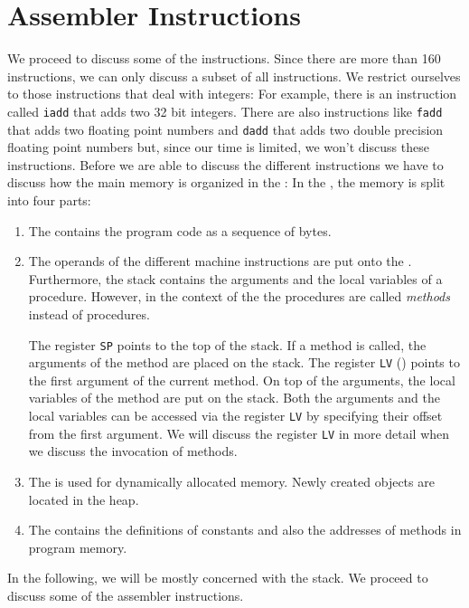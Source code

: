 \section{Assembler Instructions}
We proceed to discuss some of the  instructions.  Since there are more than 160
 instructions, we can only discuss a subset of all instructions.  We restrict ourselves to those
instructions that deal with integers:  For example, there is an instruction called \texttt{iadd} that adds
two 32 bit integers.  There are also instructions like \texttt{fadd} that adds two floating point
numbers and \texttt{dadd} that adds two double precision floating point numbers but, since our time
is limited, we won't discuss these instructions.  Before we are able to discuss the different
instructions we have to discuss how the main memory is organized in the : In the
, the memory is split into four parts: 
\begin{enumerate}
\item The  contains the program code as a sequence of bytes.
\item The operands of the different machine instructions are put onto the .
      Furthermore, the stack contains the arguments and the local variables of a procedure.
      However, in the context of the  the procedures are called \emph{methods} instead
      of procedures.

      The register \texttt{SP} points to the top of the stack.
      If a method is called, the arguments of the method are placed on the stack.  
      The register \texttt{LV} () points to the first argument of the current  
      method.    On top of the arguments, the local variables of the method are put on the stack.
      Both the arguments and the local variables can be accessed via the register \texttt{LV}
      by specifying their offset from the first argument.
      We will discuss the register \texttt{LV} in more detail when we discuss the invocation of methods. 
\item The  is used for dynamically allocated memory.  Newly created objects are
      located in the heap.
\item The  contains the definitions of constants and also the addresses of
      methods in program memory.
\end{enumerate}
In the following, we will be mostly concerned with the stack.
We proceed to discuss some of the assembler instructions.

